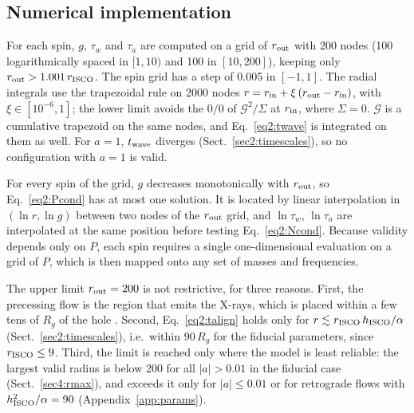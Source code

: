 \subsection{Numerical implementation}
\label{sec2:numerics}

For each spin, $g$, $\tau_w$ and $\tau_a$ are computed on a grid of $r_\textup{out}$ with 200 nodes (100 logarithmically spaced in $[1,10)$ and 100 in $[10,200]$), keeping only $r_\textup{out}>1.001\,r_\textup{ISCO}$.
The spin grid has a step of 0.005 in $[-1,1]$.
The radial integrals use the trapezoidal rule on 2000 nodes $r=r_\textup{in}+\xi\,(r_\textup{out}-r_\textup{in})$, with $\xi\in[10^{-6},1]$; the lower limit avoids the $0/0$ of $\mathcal{G}^2/\Sigma$ at $r_\textup{in}$, where $\Sigma=0$.
$\mathcal{G}$ is a cumulative trapezoid on the same nodes, and Eq.~\eqref{eq2:twave} is integrated on them as well.
For $a=1$, $t_\textup{wave}$ diverges (Sect.~\ref{sec2:timescales}), so no configuration with $a=1$ is valid.

For every spin of the grid, $g$ decreases monotonically with $r_\textup{out}$, so Eq.~\eqref{eq2:Pcond} has at most one solution.
It is located by linear interpolation in $(\ln r,\ln g)$ between two nodes of the $r_\textup{out}$ grid, and $\ln\tau_w$, $\ln\tau_a$ are interpolated at the same position before testing Eq.~\eqref{eq2:Ncond}.
Because validity depends only on $P$, each spin requires a single one-dimensional evaluation on a grid of $P$, which is then mapped onto any set of masses and frequencies.

The upper limit $r_\textup{out}=200$ is not restrictive, for three reasons.
First, the precessing flow is the region that emits the X-rays, which is placed within a few tens of $R_g$ of the hole \citep[e.g.][]{Uttley2014}.
Second, Eq.~\eqref{eq2:talign} holds only for $r\lesssim r_\textup{ISCO}\,h_\textup{ISCO}/\alpha$ (Sect.~\ref{sec2:timescales}), i.e.\ within $90\,R_g$ for the fiducial parameters, since $r_\textup{ISCO}\leq9$.
Third, the limit is reached only where the model is least reliable: the largest valid radius is below 200 for all $|a|>0.01$ in the fiducial case (Sect.~\ref{sec4:rmax}), and exceeds it only for $|a|\leq0.01$ or for retrograde flows with $h_\textup{ISCO}^2/\alpha=90$ (Appendix~\ref{app:params}).